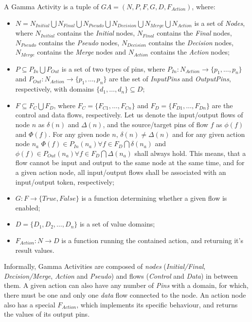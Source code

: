 \begin{definition}
	A Gamma Activity is a tuple of \(GA = (N, P, F, G, D, F_{Action})\), where:
	
	\begin{itemize}
		\item \(N = N_\mathit{Initial} \bigcup N_\mathit{Final} \bigcup N_\mathit{Pseudo} \bigcup N_\mathit{Decision} \bigcup N_\mathit{Merge} \bigcup N_\mathit{Action} \) is a set of \emph{Nodes}, where \(N_\mathit{Initial}\) contains the \emph{Initial} nodes, \(N_\mathit{Final}\) contains the \emph{Final} nodes, \(N_\mathit{Pseudo}\) contains the \emph{Pseudo} nodes, \(N_\mathit{Decision}\) contains the \emph{Decision} nodes, \(N_\mathit{Merge}\) contains the \emph{Merge} nodes and \(N_\mathit{Action}\) contains the \emph{Action} nodes;
		\item \( P \subseteq P_\mathit{In} \bigcup P_\mathit{Out} \) is a set of two types of pins, where \(P_\mathit{In} : N_\mathit{Action} \rightarrow \{ p_1, \dots, p_n \} \) and \(P_\mathit{Out} : N_\mathit{Action} \rightarrow \{ p_1, \dots, p_n \} \) are the set of \emph{InputPins} and \emph{OutputPins}, respectively, with domains \(\{ d_1, \dots, d_n \} \subseteq D \);
		\item \( F \subseteq F_C \bigcup F_D \), where \(F_C = \{ F_{C1}, \dots, F_{Cn} \} \) and \(F_D = \{ F_{D1}, \dots, F_{Dn} \} \) are the control and data flows, respectively. Let us denote the input/output flows of node \(n\) as \( \delta(n) \) and \( \Delta(n) \), and the source/target pins of flow \(f\) as \(\phi(f)\) and \(\Phi(f)\). For any given node \(n\), \( \delta(n) \neq \Delta(n) \) and for any given action node \(n_a\) \( \Phi(f) \in P_\mathit{In}(n_a) \forall f \in F_D \bigcap \delta(n_a) \) and \( \phi(f) \in P_\mathit{Out}(n_a) \forall f \in F_D \bigcap \Delta(n_a) \) shall always hold. This means, that a flow cannot be input and output to the same node at the same time, and for a given action node, all input/output flows shall be associated with an input/output token, respectively;
		\item \(G : F \rightarrow \{ \mathit{True}, \mathit{False} \} \) is a function determining whether a given flow is enabled;
		\item \(D = \{ D_{1}, D_{2}, \dots, D_{n} \} \) is a set of value domains;
		\item \(F_{Action} : N \rightarrow D \) is a function running the contained action, and returning it's result values.
	\end{itemize}
	
Informally, Gamma Activities are composed of \emph{nodes} (\emph{Initial/Final}, \emph{Decision/Merge}, \emph{Action} and \emph{Pseudo}) and flows (\emph{Control} and \emph{Data}) in between them. A given action can also have any number of \emph{Pins} with a domain, for which, there must be one and only one \emph{data} flow connected to the node. An action node also has a special \(F_{Action}\), which implements its specific behaviour, and returns the values of its output pins.
	
\end{definition}

